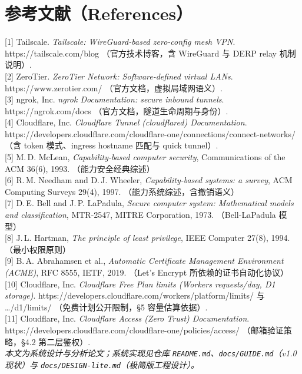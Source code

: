 \documentclass[10pt,a4paper]{article}
\begin{document}
\section*{参考文献（References）}
\noindent\sloppy\small
[1] Tailscale. \textit{Tailscale: WireGuard-based zero-config mesh VPN}. https://tailscale.com/blog （官方技术博客，含 WireGuard 与 DERP relay 机制说明）.\\[0.4em]
[2] ZeroTier. \textit{ZeroTier Network: Software-defined virtual LANs}. https://www.zerotier.com/ （官方文档，虚拟局域网语义）.\\[0.4em]
[3] ngrok, Inc. \textit{ngrok Documentation: secure inbound tunnels}. https://ngrok.com/docs （官方文档，隧道生命周期与身份）.\\[0.4em]
[4] Cloudflare, Inc. \textit{Cloudflare Tunnel (cloudflared) Documentation}. https://developers.cloudflare.com/cloudflare-one/connections/connect-networks/ （含 token 模式、ingress hostname 匹配与 quick tunnel）.\\[0.4em]
[5] M.\,D. McLean, \textit{Capability-based computer security}, Communications of the ACM 36(6), 1993. （能力安全经典综述）\\[0.4em]
[6] R.\,M. Needham and D.\,J. Wheeler, \textit{Capability-based systems: a survey}, ACM Computing Surveys 29(4), 1997. （能力系统综述，含撤销语义）\\[0.4em]
[7] D.\,E. Bell and J.\,P. LaPadula, \textit{Secure computer system: Mathematical models and classification}, MTR-2547, MITRE Corporation, 1973. （Bell-LaPadula 模型）\\[0.4em]
[8] J.\,L. Hartman, \textit{The principle of least privilege}, IEEE Computer 27(8), 1994. （最小权限原则）\\[0.4em]
[9] B.\,A. Abrahamsen et al., \textit{Automatic Certificate Management Environment (ACME)}, RFC 8555, IETF, 2019. （Let's Encrypt 所依赖的证书自动化协议）\\[0.4em]
[10] Cloudflare, Inc. \textit{Cloudflare Free Plan limits (Workers requests/day, D1 storage)}. https://developers.cloudflare.com/workers/platform/limits/ 与 \ldots/d1/limits/ （免费计划公开限制，§5 容量估算依据）.\\[0.4em]
[11] Cloudflare, Inc. \textit{Cloudflare Access (Zero Trust) Documentation}. https://developers.cloudflare.com/cloudflare-one/policies/access/ （邮箱验证策略，§4.2 第二层鉴权）.\\[1em]
\noindent\itshape 本文为系统设计与分析论文；系统实现见仓库 \texttt{README.md}、\texttt{docs/GUIDE.md}（v1.0 现状）与 \texttt{docs/DESIGN-lite.md}（极简版工程设计）。
\end{document}
